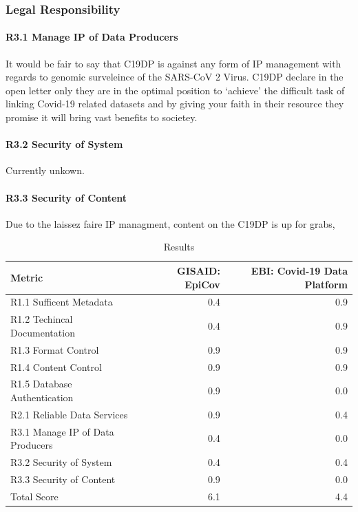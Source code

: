\documentclass{article}
\begin{document}
\hypertarget{legal-responsibility-2}{%
\subsubsection{Legal Responsibility}\label{legal-responsibility-2}}

\hypertarget{r3.1-manage-ip-of-data-producers-1}{%
\paragraph{R3.1 Manage IP of Data
Producers}\label{r3.1-manage-ip-of-data-producers-1}}

It would be fair to say that C19DP is against any form of IP management
with regards to genomic surveleince of the SARS-CoV 2 Virus. C19DP
declare in the open letter only they are in the optimal position to
`achieve' the difficult task of linking Covid-19 related datasets and by
giving your faith in their resource they promise it will bring vast
benefits to societey.

\hypertarget{r3.2-security-of-system-1}{%
\paragraph{R3.2 Security of System}\label{r3.2-security-of-system-1}}

Currently unkown.

\hypertarget{r3.3-security-of-content-1}{%
\paragraph{R3.3 Security of Content}\label{r3.3-security-of-content-1}}

Due to the laissez faire IP managment, content on the C19DP is up for
grabs,

\begin{table}[H]

\caption{\label{tab:fig3}Results}
\centering
\begin{tabular}[t]{l|r|r}
\hline
Metric & GISAID: EpiCov & EBI: Covid-19 Data Platform\\
\hline
R1.1 Sufficent Metadata & 0.4 & 0.9\\
\hline
R1.2 Techincal Documentation & 0.4 & 0.9\\
\hline
R1.3 Format Control & 0.9 & 0.9\\
\hline
R1.4 Content Control & 0.9 & 0.9\\
\hline
R1.5  Database Authentication & 0.9 & 0.0\\
\hline
R2.1 Reliable Data Services & 0.9 & 0.4\\
\hline
R3.1 Manage IP of Data Producers & 0.4 & 0.0\\
\hline
R3.2 Security of System & 0.4 & 0.4\\
\hline
R3.3 Security of Content & 0.9 & 0.0\\
\hline
Total Score & 6.1 & 4.4\\
\hline
\end{tabular}
\end{table}
\end{document}
